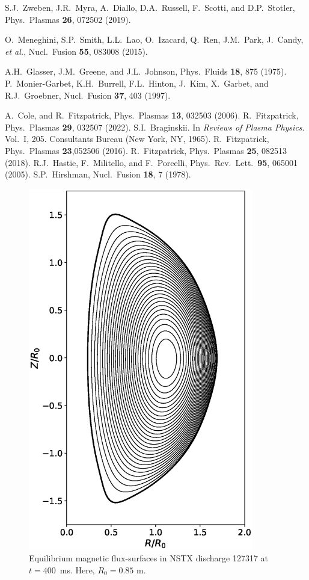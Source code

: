 \documentclass[12pt,prb,aps]{revtex4-1}
\begin{document}
\begin{thebibliography}{99}
 S.J.~Zweben,   J.R.~Myra,  A.~Diallo,   D.A.~Russell,   F.~Scotti,   and D.P.~Stotler, Phys.\ Plasmas
{\bf 26}, 072502 (2019). 


 O.~Meneghini, S.P.~Smith, L.L.~Lao, O.~Izacard, Q.~Ren, J.M.~Park, J.~Candy, {\em et al.}, Nucl.\ Fusion {\bf 55}, 083008 (2015). 

 A.H.~Glasser, J.M.~Greene, and J.L.~Johnson, Phys.\ Fluids {\bf 18}, 875 (1975).
 P.~Monier-Garbet, K.H.~Burrell, F.L.~Hinton, J.~Kim, X.~Garbet, and R.J.~Groebner, Nucl.\ Fusion {\bf 37}, 403 (1997).

 A.~Cole, and R.~Fitzpatrick, Phys.\ Plasmas {\bf 13}, 032503 (2006).
 R.~Fitzpatrick, Phys.\ Plasmas {\bf 29}, 032507 (2022). 
 S.I.~Braginskii. In {\em Reviews of Plasma Physics}. Vol.~I, 205. Consultants Bureau (New York, NY, 1965).
 R.~Fitzpatrick, Phys.\ Plasmas {\bf 23},052506 (2016).
 R.~Fitzpatrick, Phys.\ Plasmas {\bf 25}, 082513 (2018).
 R.J.~Hastie, F.~Militello, and F.~Porcelli, Phys.\ Rev.\ Lett.\ {\bf 95}, 065001 (2005).
 S.P.~Hirshman, Nucl.\ Fusion {\bf 18}, 7 (1978). 

\end{thebibliography}
\newpage

\begin{figure}
\centerline{\includegraphics[height=6.25in]{Fig1.eps}}
\caption{Equilibrium magnetic flux-surfaces in NSTX discharge 127317 at $t=400$\, ms. Here, $R_0=0.85$ m.}\label{fig1}
\end{figure}
\end{document}
